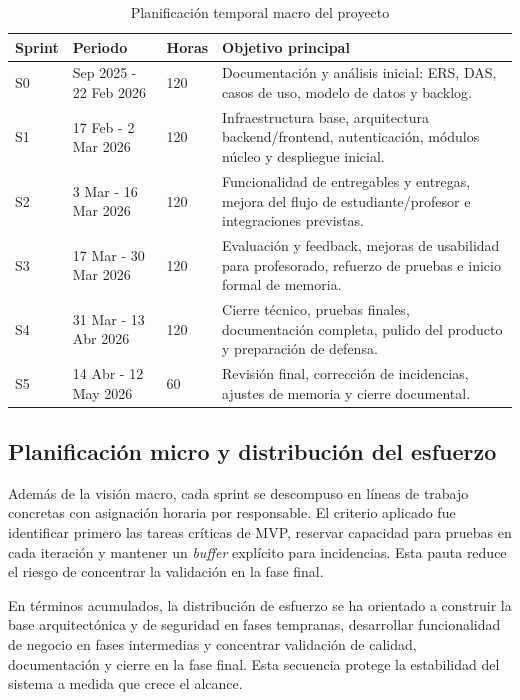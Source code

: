 \begin{table}[!htbp]
\centering
\begin{tabular}{|P{1.3cm}|P{2.8cm}|P{1.8cm}|P{5.8cm}|}
\hline
\textbf{Sprint} & \textbf{Periodo} & \textbf{Horas} & \textbf{Objetivo principal} \\
\hline
S0 & Sep 2025 - 22 Feb 2026 & 120 & Documentaci\'on y an\'alisis inicial: ERS, DAS, casos de uso, modelo de datos y backlog. \\
\hline
S1 & 17 Feb - 2 Mar 2026 & 120 & Infraestructura base, arquitectura backend/frontend, autenticaci\'on, m\'odulos n\'ucleo y despliegue inicial. \\
\hline
S2 & 3 Mar - 16 Mar 2026 & 120 & Funcionalidad de entregables y entregas, mejora del flujo de estudiante/profesor e integraciones previstas. \\
\hline
S3 & 17 Mar - 30 Mar 2026 & 120 & Evaluaci\'on y feedback, mejoras de usabilidad para profesorado, refuerzo de pruebas e inicio formal de memoria. \\
\hline
S4 & 31 Mar - 13 Abr 2026 & 120 & Cierre t\'ecnico, pruebas finales, documentaci\'on completa, pulido del producto y preparaci\'on de defensa. \\
\hline
S5 & 14 Abr - 12 May 2026 & 60 & Revisi\'on final, correcci\'on de incidencias, ajustes de memoria y cierre documental. \\
\hline
\end{tabular}
\caption{Planificaci\'on temporal macro del proyecto}
\label{tab:plan-macro-sprints}
\end{table}

\subsection{Planificaci\'on micro y distribuci\'on del esfuerzo}

Adem\'as de la visi\'on macro, cada sprint se descompuso en l\'ineas de trabajo concretas
con asignaci\'on horaria por responsable. El criterio aplicado fue identificar primero las tareas cr\'iticas de MVP, reservar capacidad para pruebas en cada iteraci\'on y mantener un \emph{buffer} expl\'icito para incidencias. Esta pauta reduce el riesgo de concentrar la validaci\'on en la fase final.

En t\'erminos acumulados, la distribuci\'on de esfuerzo se ha orientado a construir la base arquitect\'onica y de seguridad en fases tempranas, desarrollar funcionalidad de negocio en fases intermedias y concentrar validaci\'on de calidad, documentaci\'on y cierre en la fase final. Esta secuencia protege la estabilidad del sistema a medida que crece el alcance.

